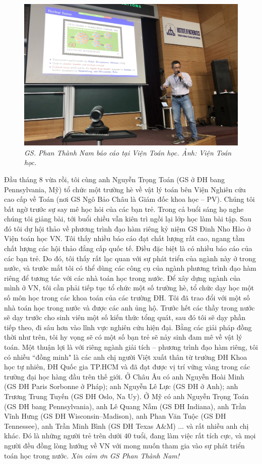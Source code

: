 \begin{multicols}{2}
\begin{figure}[H]
		\includegraphics[width=1\linewidth]{4}
		\caption{\small\textit{\color{diendantoanhoc}GS. Phan Thành Nam báo cáo tại Viện Toán học. Ảnh: Viện Toán học.}}
		\vspace*{-10pt}
	\end{figure}
	Đầu tháng $8$ vừa rồi, tôi cùng anh Nguyễn Trọng Toán (GS ở ĐH bang Pennsylvania, Mỹ) tổ chức một trường hè về vật lý toán bên Viện Nghiên cứu cao cấp về Toán (nơi GS Ngô Bảo Châu là Giám đốc khoa học -- PV). Chúng tôi bất ngờ trước sự say mê học hỏi của các bạn trẻ. Trong cả buổi sáng họ nghe chúng tôi giảng bài, tới buổi chiều vẫn kiên trì ngồi lại lớp học làm bài tập. Sau đó tôi dự hội thảo về phương trình đạo hàm riêng kỷ niệm GS Đinh Nho Hào ở Viện toán học VN. Tôi thấy nhiều báo cáo đạt chất lượng rất cao, ngang tầm chất lượng các hội thảo đẳng cấp quốc tế. Điều đặc biệt là có nhiều báo cáo của các bạn trẻ. Do đó, tôi thấy rất lạc quan với sự phát triển của ngành này ở trong nước, và trước mắt tôi có thể dùng các công cụ của ngành phương trình đạo hàm riêng để tương tác với các nhà toán học trong nước. 
	\vskip 0.1cm
	Để xây dựng ngành của mình ở VN, tôi cần phải tiếp tục tổ chức một số trường hè, tổ chức dạy học một số môn học trong các khoa toán của các trường ĐH. Tôi đã trao đổi với một số nhà toán học trong nước và được các anh ủng hộ. Trước hết các thầy trong nước sẽ dạy trước cho sinh viên một số kiến thức tổng quát, sau đó tôi sẽ dạy phần tiếp theo, đi sâu hơn vào lĩnh vực nghiên cứu hiện đại. Bằng các giải pháp đồng thời như trên, tôi hy vọng sẽ có một số bạn trẻ sẽ nảy sinh đam mê về vật lý toán.
	\vskip 0.1cm 
	Một thuận lợi là với riêng ngành giải tích -- phương trình đạo hàm riêng, tôi có nhiều ``đồng minh" là các anh chị người Việt xuất thân từ trường ĐH Khoa học tự nhiên, ĐH Quốc gia TP.HCM và đã đạt được vị trí vững vàng trong các trường đại học hàng đầu trên thế giới. Ở Châu Âu có anh Nguyễn Hoài Minh (GS ĐH Paris Sorbonne ở Pháp); anh Nguyễn Lê Lực (GS ĐH ở Anh); anh Trương Trung Tuyến (GS ĐH Oslo, Na Uy). Ở Mỹ có anh  Nguyễn Trọng Toán (GS ĐH bang Pennsylvania), anh Lê Quang Nẫm (GS ĐH Indiana), anh Trần Vĩnh Hưng (GS ĐH Wisconsin–Madison), anh Phan Văn  Tuộc (GS ĐH Tennessee), anh Trần Minh Bình (GS ĐH Texas A\&M) ... và rất nhiều anh chị khác. Đó là những người trẻ trên dưới $40$ tuổi, đang làm việc rất tích cực, và mọi người đều đồng lòng hướng về VN với mong muốn tham gia vào sự phát triển toán học trong nước.
	\vskip 0.1cm
	\textit{Xin cảm ơn GS Phan Thành Nam!} 
\end{multicols}